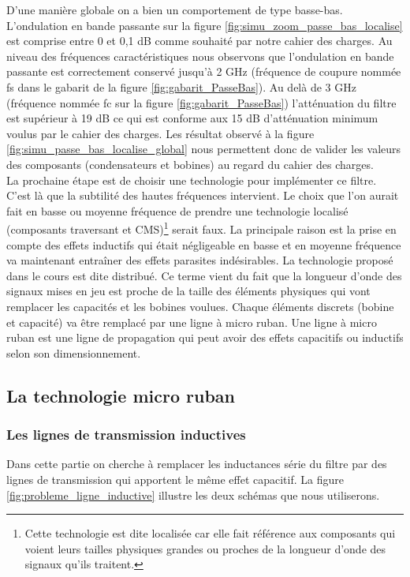 \documentclass[french]{article}
\begin{document}
D'une manière globale on a bien un comportement de type basse-bas. L'ondulation en bande passante sur la figure \ref{fig:simu_zoom_passe_bas_localise} est comprise entre 0 et 0,1 dB comme souhaité par notre cahier des charges. Au niveau des fréquences caractéristiques nous observons que l'ondulation en bande passante est correctement conservé jusqu'à 2 GHz (fréquence de coupure nommée fs dans le gabarit de la figure \ref{fig:gabarit_PasseBas}). Au delà de 3 GHz (fréquence nommée fc sur la figure \ref{fig:gabarit_PasseBas}) l'atténuation du filtre est supérieur à 19 dB ce qui est conforme aux 15 dB d'atténuation minimum voulus par le cahier des charges. Les résultat observé à la figure \ref{fig:simu_passe_bas_localise_global} nous permettent donc de valider les valeurs des composants (condensateurs et bobines) au regard du cahier des charges. \\


La prochaine étape est de choisir une technologie pour implémenter ce filtre. C'est là que la subtilité des hautes fréquences intervient. Le choix que l'on aurait fait en basse ou moyenne fréquence de prendre une technologie localisé (composants traversant et CMS)\footnote{Cette technologie est dite localisée car elle fait référence aux composants qui voient leurs tailles physiques grandes ou proches de la longueur d'onde des signaux qu'ils traitent.} serait faux. La principale raison est la prise en compte des effets inductifs qui était négligeable en basse et en moyenne fréquence va maintenant entraîner des effets parasites indésirables. La technologie proposé dans le cours est dite distribué. Ce terme vient du fait que la longueur d'onde des signaux mises en jeu est proche de la taille des éléments physiques qui vont remplacer les capacités et les bobines voulues. Chaque éléments discrets (bobine et capacité) va être remplacé par une ligne à micro ruban. Une ligne à micro ruban est une ligne de propagation qui peut avoir des effets capacitifs ou inductifs selon son dimensionnement. 

\subsection{La technologie micro ruban}
\subsubsection{Les lignes de transmission inductives}


Dans cette partie on cherche à remplacer les inductances série du filtre par des lignes de transmission qui apportent le même effet capacitif. La figure \ref{fig:probleme_ligne_inductive} illustre les deux schémas que nous utiliserons.
\end{document}
